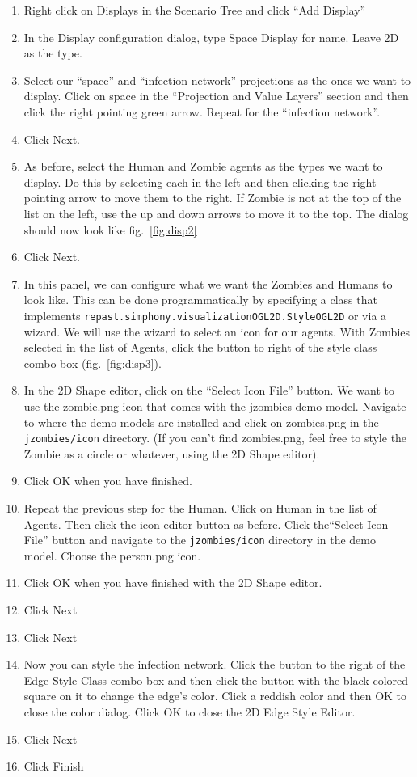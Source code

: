 \documentclass[11pt]{amsart}
\begin{document}
\vspace{.2in}
\begin{enumerate}
\item Right click on Displays in the Scenario Tree and click ``Add Display''
\item In the Display configuration dialog, type Space Display for name. Leave 2D as the type.
\item Select our ``space'' and ``infection network'' projections as the ones we want to display. Click on space in the ``Projection and Value Layers'' section and then click the right pointing green arrow. Repeat for the ``infection network''.
\item Click Next.
\item As before, select the Human and Zombie agents as the types we want to display. Do this by selecting each in the left and then clicking the right pointing arrow to move them to the right. If Zombie is not at the top of the list on the left, use the up and down arrows to move it to the top. The dialog should now look like fig.~\ref{fig:disp2}
\item Click Next.
\item In this panel, we can configure what we want the Zombies and Humans to look like. This can be done programmatically by specifying a class that implements \texttt{repast.simphony.visualizationOGL2D.StyleOGL2D} or via a wizard. We will use the wizard to select an icon for our agents. With Zombies selected in the list of Agents, click the button to right of the style class combo box (fig.~\ref{fig:disp3}).
\item In the 2D Shape editor, click on the ``Select Icon File'' button. We want to use the zombie.png icon that comes with the jzombies demo model. Navigate to where the demo models are installed and click on zombies.png in the \texttt{jzombies/icon} directory. (If you can't find zombies.png, feel free to style the Zombie as a circle or whatever, using the 2D Shape editor).
\item Click OK when you have finished.
\item Repeat the previous step for the Human. Click on Human in the list of Agents. Then click the icon editor button as before. Click the``Select Icon File'' button and navigate to the \texttt{jzombies/icon} directory in the demo model. Choose the person.png icon.
\item Click OK when you have finished with the 2D Shape editor.
\item Click Next
\item Click Next
\item Now you can style the infection network. Click the button to the right of the Edge Style Class combo box and then click the button with the black colored square on it to change the edge's color. Click a reddish color and then OK to close the color dialog. Click OK to close the 2D Edge Style Editor.
\item Click Next
\item Click Finish
\end{enumerate}
\vspace{.2in}
\end{document}
